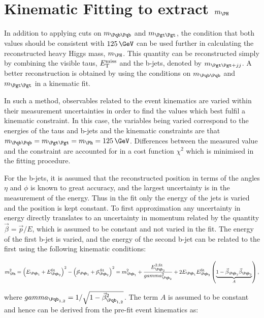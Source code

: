 \section{Kinematic Fitting to extract $m_{\PH}$}
\label{sec:kinematicfit}

In addition to applying cuts on $m_{\Pqb\Pqb}$ and $m_{\Pgt\Pgt}$, the condition that
both values should be consistent with $125\,\GeV$ can be used further in
calculating the reconstructed heavy Higgs mass, $m_{\PH}$. This quantity can be reconstructed simply
by combining the visible taus, $E_{\mathrm{T}}^{\text{miss}}$ and the b-jets, denoted by $m_{\Pgt\Pgt+jj}$.
A better reconstruction is obtained by using the conditions on $m_{\Pqb\Pqb}$ and
$m_{\Pgt\Pgt}$ in a kinematic fit. 

In such a method, observables related to the
event kinematics are varied within their measurement uncertainties in order to
find the values which best fulfil a kinematic constraint. In this case, the
variables being varied correspond to the energies of the taus and b-jets and the
kinematic constraints are that $m_{\Pqb\Pqb} = m_{\Pgt\Pgt} = m_{\Ph} = 125\,\GeV$. 
Differences between the measured value and the constraint are accounted for in a cost
function $\chi^{2}$ which is minimised in the fitting procedure.  

For the b-jets, it is assumed that the reconstructed position in terms of the
angles $\eta$ and $\phi$ is known to great accuracy, and the largest
uncertainty is in the measurement of the energy. Thus in the fit only the
energy of the jets is varied and the position is kept constant. To first
approximation any uncertainty in energy directly translates to an uncertainty in
momentum related by the quantity $\vec{\beta} = \vec{p}/E$, which is assumed to be constant and 
not varied in the fit. The energy of the first b-jet is varied, and the
energy of the second b-jet can be related to the first using the following
kinematic conditions:

\begin{equation}
m_{\Ph}^{2} = \left( E_{\Pqb_{1}} + E_{\Pqb_{2}}^{\text{fit}} \right)^{2} -
\left(\vec{p}_{\Pqb_{1}} + \vec{p}_{\Pqb_{2}}^{\text{~fit}}\right)^{2} 
= m_{\Pqb_{1}}^{2} + \frac{E_{\Pqb_{2}}^{2,\text{fit}}}{\gamma_{\Pqb_{2}}^{2}} +
2E_{\Pqb_{1}}E_{\Pqb_{2}}^{\text{fit}}\left(\underbrace{1-\vec{\beta}_{\Pqb_{1}}\vec{\beta}_{\Pqb_{2}}}_{A}\right),   
\label{eq:bjetkinfit}         
\end{equation}

where $\gamma_{\Pqb_{1,2}} = 1/\sqrt{1-\vec{\beta}_{\Pqb_{1,2}}^{2}}$. The term $A$ is
assumed to be constant and hence can be derived from the pre-fit event
kinematics as:

